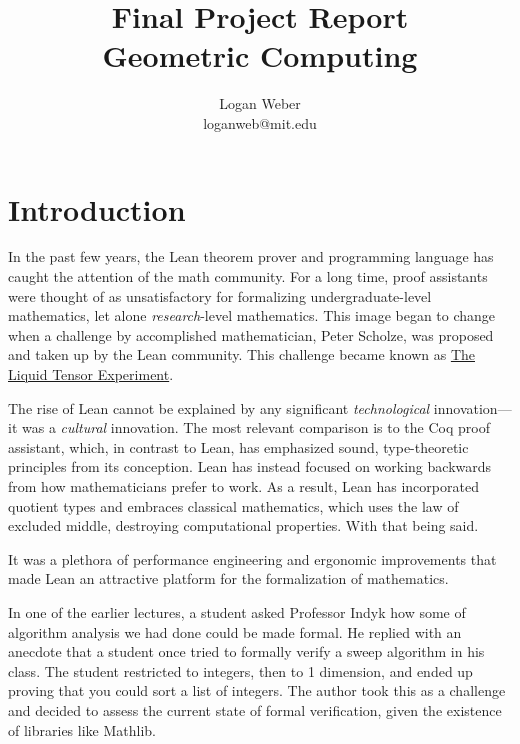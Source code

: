 \documentclass{article}
\begin{document}
\title{%
  Final Project Report
  \\[0.5em]
  \large Geometric Computing \\
}

\author{
Logan Weber\\
loganweb@mit.edu
}

\def\aSigma{\overline{\Sigma}}
\def\asigma{\overline{\sigma}}
\def\aheap{\overline{h}}

\date{}

\maketitle

\section{Introduction}
In the past few years, the Lean theorem prover and programming language has caught the attention of the math community.
For a long time, proof assistants were thought of as unsatisfactory for formalizing undergraduate-level mathematics, let alone \textit{research}-level mathematics.
This image began to change when a challenge by accomplished mathematician, Peter Scholze, was proposed and taken up by the Lean community.
This challenge became known as \href{https://xenaproject.wordpress.com/2020/12/05/liquid-tensor-experiment/}{The Liquid Tensor Experiment}.


The rise of Lean cannot be explained by any significant \textit{technological} innovation---it was a \textit{cultural} innovation.
The most relevant comparison is to the Coq proof assistant, which, in contrast to Lean, has emphasized sound, type-theoretic principles from its conception.
Lean has instead focused on working backwards from how mathematicians prefer to work.
As a result, Lean has incorporated quotient types and embraces classical mathematics, which uses the law of excluded middle, destroying computational properties.
With that being said.


It was a plethora of performance engineering and ergonomic improvements that made Lean an attractive platform for the formalization of mathematics.

In one of the earlier lectures, a student asked Professor Indyk how some of algorithm analysis we had done could be made formal.
He replied with an anecdote that a student once tried to formally verify a sweep algorithm in his class.
The student restricted to integers, then to 1 dimension, and ended up proving that you could sort a list of integers.
The author took this as a challenge and decided to assess the current state of formal verification, given the existence of libraries like Mathlib.
\end{document}
